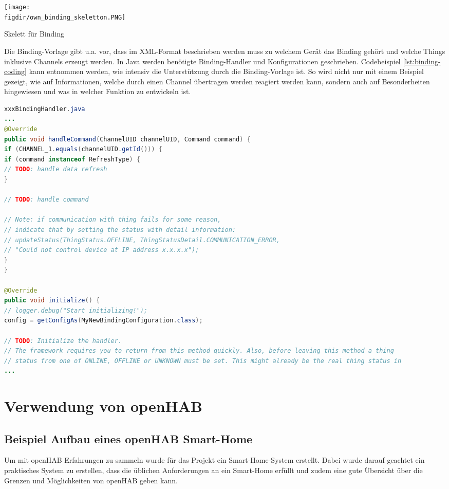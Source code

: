 \smallskip
{
	\centering
	\captionsetup{type=figure}
	\texttt{[image: \\figdir/own\_binding\_skeletton.PNG]}
	\caption{Skelett für Binding \label{fig:own_binding_skeleton}}
}

Die Binding-Vorlage gibt u.a. vor, dass im XML-Format beschrieben werden muss zu welchem Gerät das Binding gehört und welche Things inklusive Channels erzeugt werden. In Java werden benötigte Binding-Handler und Konfigurationen geschrieben. Codebeispiel \ref{lst:binding-coding} kann entnommen werden, wie intensiv die Unterstützung durch die Binding-Vorlage ist. So wird nicht nur mit einem Beispiel gezeigt, wie auf Informationen, welche durch einen Channel übertragen werden reagiert werden kann, sondern auch auf Besonderheiten hingewiesen und was in welcher Funktion zu entwickeln ist.


\begin{lstlisting}[language=java,firstnumber=1,caption=Handler.java Ausschnitt,label=lst:binding-coding]
xxxBindingHandler.java
...
@Override
public void handleCommand(ChannelUID channelUID, Command command) {
if (CHANNEL_1.equals(channelUID.getId())) {
if (command instanceof RefreshType) {
// TODO: handle data refresh
}

// TODO: handle command

// Note: if communication with thing fails for some reason,
// indicate that by setting the status with detail information:
// updateStatus(ThingStatus.OFFLINE, ThingStatusDetail.COMMUNICATION_ERROR,
// "Could not control device at IP address x.x.x.x");
}
}

@Override
public void initialize() {
// logger.debug("Start initializing!");
config = getConfigAs(MyNewBindingConfiguration.class);

// TODO: Initialize the handler.
// The framework requires you to return from this method quickly. Also, before leaving this method a thing
// status from one of ONLINE, OFFLINE or UNKNOWN must be set. This might already be the real thing status in
...
\end{lstlisting}


\section{Verwendung von openHAB}
\label{s:usage-open-hab}


\subsection{Beispiel Aufbau eines openHAB Smart-Home}
	Um mit openHAB Erfahrungen zu sammeln wurde für das Projekt ein  Smart-Home-System erstellt. Dabei wurde darauf geachtet ein praktisches System zu erstellen, dass die üblichen Anforderungen an ein Smart-Home erfüllt und zudem eine gute Übersicht über die Grenzen und Möglichkeiten von openHAB geben kann.

